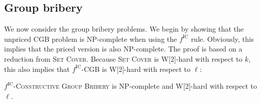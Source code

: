 \documentclass[
    12pt,               %
    a4paper,            %
    bibtotoc,           %
    pointlessnumbers,   %
    ngerman,            %
    titlepage,          %
    leqno,              %
    ]{scrarticle}       %
\begin{document}
\clearpage

\subsection{Group bribery}

We now consider the group bribery problems. We begin by showing that the unpriced CGB problem is NP-complete when using the $f^{\text{IC}}$ rule. Obviously, this implies that the priced version is also NP-complete. The proof is based on a reduction from \textsc{Set Cover}. Because \textsc{Set Cover} is W[2]-hard with respect to $k$, this also implies that $f^{\text{IC}}$-CGB is W[2]-hard with respect to $\ell$:

\begin{Theorem} \label{thm:ic_cgb_npc}
$f^{\text{IC}}$-\textsc{Constructive Group Bribery} is NP-complete and W[2]-hard with respect to $\ell$.
\end{Theorem}
\end{document}
